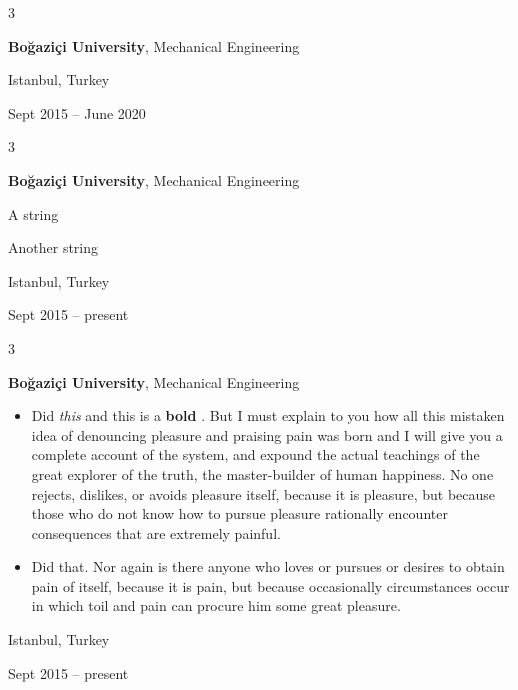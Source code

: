 \documentclass[10pt, letterpaper]{article}
\newenvironment{summary}{
    \begin{description}[
        topsep=0.10 cm,
        parsep=0.10 cm,
        partopsep=0pt,
        itemsep=0pt,
        leftmargin=0.4 cm + 10pt
    ]
}{
    \end{description}
} %
\newenvironment{highlights}{
    \begin{itemize}[
        topsep=0.10 cm,
        parsep=0.10 cm,
        partopsep=0pt,
        itemsep=0pt,
        leftmargin=0.4 cm + 10pt
    ]
}{
    \end{itemize}
} %
\newenvironment{threecolentry}[3][]{
    \onecolentry
    \def\thirdColumn{#3}
    \setcolumnwidth{1 cm, \fill, 4.5 cm}
    \begin{paracol}{3}
    {\raggedright #2} \switchcolumn
}{
    \switchcolumn \raggedleft \thirdColumn
    \end{paracol}
    \endonecolentry
} %
\let\hrefWithoutArrow\href
\renewcommand{\href}[2]{\hrefWithoutArrow{#1}{\ifthenelse{\equal{#2}{}}{ }{#2 }\raisebox{.15ex}{\footnotesize \faExternalLink*}}}
\begin{document}
        \vspace{0.2 cm}

        \begin{threecolentry}{\textbf{}}{
            Istanbul, Turkey

        Sept 2015 – June 2020
        }
            \textbf{Boğaziçi University}, Mechanical Engineering
        \end{threecolentry}

        \vspace{0.2 cm}

        \begin{threecolentry}{\textbf{}}{
            Istanbul, Turkey

        Sept 2015 – present
        }
            \textbf{Boğaziçi University}, Mechanical Engineering
            \begin{summary}
                \item A string
                \item Another string
            \end{summary}
        \end{threecolentry}

        \vspace{0.2 cm}

        \begin{threecolentry}{\textbf{}}{
            Istanbul, Turkey

        Sept 2015 – present
        }
            \textbf{Boğaziçi University}, Mechanical Engineering
            \begin{highlights}
                \item Did \textit{this} and this is a \textbf{bold} \href{https://example.com}{link}. But I must explain to you how all this mistaken idea of denouncing pleasure and praising pain was born and I will give you a complete account of the system, and expound the actual teachings of the great explorer of the truth, the master-builder of human happiness. No one rejects, dislikes, or avoids pleasure itself, because it is pleasure, but because those who do not know how to pursue pleasure rationally encounter consequences that are extremely painful.
                \item Did that. Nor again is there anyone who loves or pursues or desires to obtain pain of itself, because it is pain, but because occasionally circumstances occur in which toil and pain can procure him some great pleasure.
            \end{highlights}
        \end{threecolentry}
\end{document}

